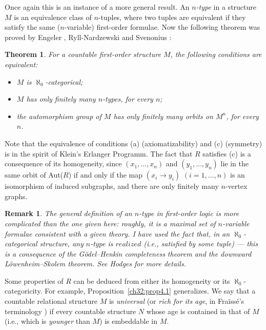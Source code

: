 \documentclass[12pt]{article}
\newtheorem{theorem}{Theorem}
\newtheorem{remark}{Remark}
\begin{document}
Once again this is an instance of a more general result. An
\emph{$n$-type} in a structure $M$ is an equivalence class of
$n$-tuples, where two tuples are equivalent if they satisfy the same
($n$-variable) first-order formulae. Now the following theorem was
proved by Engeler \cite{ch32:bib16}, Ryll-Nardzewski
\cite{ch32:bib44} and Svenonius \cite{ch32:bib49}:

\begin{theorem}\label{ch32:them5.2} 
For a countable first-order structure $M$, the
following conditions are equivalent:
\begin{itemize}
\item[(a)] $M$ is $\aleph_0$-categorical;
\item[(b)] $M$ has only finitely many $n$-types, for every $n$;
\item[(c)] the automorphism group of $M$ has only finitely many orbits on $M^n$, for every
$n$.
\end{itemize}
\end{theorem}

Note that the equivalence of conditions (a) (axiomatizability) and
(c) (symmetry) is in the spirit of Klein's Erlanger Programm. The
fact that $R$ satisfies (c) is a consequence of its homogeneity,
since $(x_1,\ldots, x_n)$ and $(y_1,\ldots,y_n)$ lie in the same
orbit of Aut($R$) if and only if the map $(x_i \rightarrow y_i)$ $(i
= 1,\ldots, n)$ is an isomorphism of induced subgraphs, and there
are only finitely many $n$-vertex graphs.

\begin{remark}\label{ch32:rem5.1}\rm 
The general definition of an $n$-type in
first-order logic is more complicated than the one given here:
roughly, it is a maximal set of $n$-variable formulae consistent
with a given theory. I have used the fact that, in an
$\aleph_0$-categorical structure, any $n$-type is $realized$ (i.e.,
satisfied by some tuple) --- this is a consequence of the
G\"{o}del--Henkin completeness theorem and the downward
L\"{o}wenheim--Skolem theorem. See Hodges \cite{ch32:bib28} for more
details.
\end{remark}

Some properties of $R$ can be deduced from either its homogeneity or
its $\aleph_0$-categoricity. For example,
Proposition~\ref{ch32:prop4.1} generalizes. We say that a countable
relational structure $M$ is \emph{universal} (or \emph{rich for its
age}, in Fra\"{i}ss\'{e}'s terminology \cite{ch32:bib22}) if every
countable structure $N$ whose age is contained in that of $M$ (i.e.,
which is \emph{younger} than $M$) is embeddable in $M$.
\end{document}
